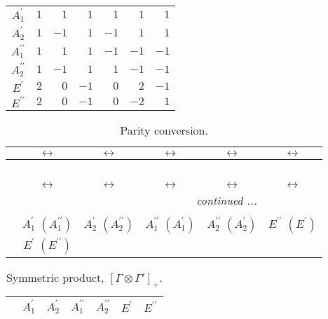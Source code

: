 \documentclass[fleqn,10pt,landscape]{article}
\begin{document}
\begin{itemize}
\begin{center}
\begin{longtable}{c|rrrrrr}
$ A_{1}^{\prime} $ & $ 1 $ & $ 1 $ & $ 1 $ & $ 1 $ & $ 1 $ & $ 1 $ \\
$ A_{2}^{\prime} $ & $ 1 $ & $ -1 $ & $ 1 $ & $ -1 $ & $ 1 $ & $ 1 $ \\
$ A_{1}^{\prime\prime} $ & $ 1 $ & $ 1 $ & $ 1 $ & $ -1 $ & $ -1 $ & $ -1 $ \\
$ A_{2}^{\prime\prime} $ & $ 1 $ & $ -1 $ & $ 1 $ & $ 1 $ & $ -1 $ & $ -1 $ \\
$ E^{\prime} $ & $ 2 $ & $ 0 $ & $ -1 $ & $ 0 $ & $ 2 $ & $ -1 $ \\
$ E^{\prime\prime} $ & $ 2 $ & $ 0 $ & $ -1 $ & $ 0 $ & $ -2 $ & $ 1 $ \\
\end{longtable}
\end{center}
\begin{center}
\renewcommand{\arraystretch}{1.0}
\begin{longtable}{cccccc}
\caption{Parity conversion.}
 \\
 \hline \hline
 & $\leftrightarrow$ & $\leftrightarrow$ & $\leftrightarrow$ & $\leftrightarrow$ & $\leftrightarrow$ \\ \hline \endfirsthead

\multicolumn{5}{l}{\tablename\ \thetable{}} \\
 \hline \hline
 & $\leftrightarrow$ & $\leftrightarrow$ & $\leftrightarrow$ & $\leftrightarrow$ & $\leftrightarrow$ \\ \hline \endhead

 \hline \hline
\multicolumn{5}{r}{\footnotesize\it continued ...} \\ \endfoot

 \hline \hline
\multicolumn{5}{r}{} \\ \endlastfoot

 & $ A_{1}^{\prime}\,\,(A_{1}^{\prime\prime}) $ & $ A_{2}^{\prime}\,\,(A_{2}^{\prime\prime}) $ & $ A_{1}^{\prime\prime}\,\,(A_{1}^{\prime}) $ & $ A_{2}^{\prime\prime}\,\,(A_{2}^{\prime}) $ & $ E^{\prime\prime}\,\,(E^{\prime}) $ \\
& $ E^{\prime}\,\,(E^{\prime\prime}) $ & $  $ & $  $ & $  $ & $  $ \\
\end{longtable}
\end{center}
\begin{center}
\renewcommand{\arraystretch}{1.0}
\begin{longtable}{c|cccccc}
\caption{Symmetric product, $[\Gamma\otimes\Gamma']_+.$}
 \\
 \hline \hline
 & $ A_{1}^{\prime} $ & $ A_{2}^{\prime} $ & $ A_{1}^{\prime\prime} $ & $ A_{2}^{\prime\prime} $ & $ E^{\prime} $ & $ E^{\prime\prime} $ \\ \hline \endfirsthead


\end{longtable}
\end{center}
\end{itemize}
\end{document}

